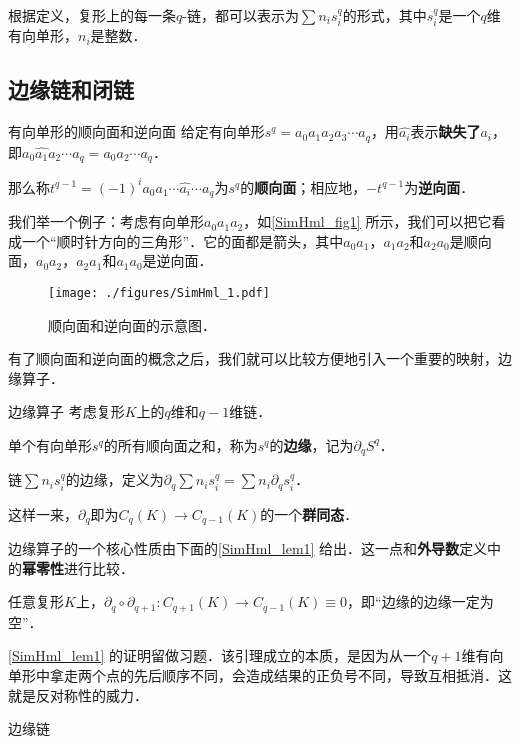 根据定义，复形上的每一条$q$-链，都可以表示为$\sum n_is^q_i$的形式，其中$s^q_i$是一个$q$维有向单形，$n_i$是整数．

\subsection{边缘链和闭链}

\begin{definition}{有向单形的顺向面和逆向面}
给定有向单形$s^q=a_0a_1a_2a_3\cdots a_q$，用$\hat{a_i}$表示\textbf{缺失了}$a_i$，即$a_0\hat{a_1}a_2\cdots a_q=a_0a_2\cdots a_q$．

那么称$t^{q-1}=(-1)^ia_0a_1\cdots\hat{a_i}\cdots a_q$为$s^q$的\textbf{顺向面}；相应地，$-t^{q-1}$为\textbf{逆向面}．
\end{definition}

我们举一个例子：考虑有向单形$a_0a_1a_2$，如\autoref{SimHml_fig1} 所示，我们可以把它看成一个“顺时针方向的三角形”．它的面都是箭头，其中$a_0a_1$，$a_1a_2$和$a_2a_0$是顺向面，$a_0a_2$，$a_2a_1$和$a_1a_0$是逆向面．

\begin{figure}[ht]
\centering
\texttt{[image: ./figures/SimHml\_1.pdf]}
\caption{顺向面和逆向面的示意图．} \label{SimHml_fig1}
\end{figure}

有了顺向面和逆向面的概念之后，我们就可以比较方便地引入一个重要的映射，边缘算子．

\begin{definition}{边缘算子}
考虑复形$K$上的$q$维和$q-1$维链．

单个有向单形$s^q$的所有顺向面之和，称为$s^q$的\textbf{边缘}，记为$\partial_q S^q$．

链$\sum n_is^q_i$的边缘，定义为$\partial_q \sum n_is^q_i=\sum n_i\partial_qs^q_i$．

这样一来，$\partial_q$即为$C_q(K)\to C_{q-1}(K)$的一个\textbf{群同态}．
\end{definition}

边缘算子的一个核心性质由下面的\autoref{SimHml_lem1} 给出．这一点和\textbf{外导数}定义中的\textbf{幂零性}进行比较．

\begin{lemma}{}\label{SimHml_lem1}
任意复形$K$上，$\partial_q\circ\partial_{q+1}:C_{q+1}(K)\to C_{q-1}(K)\equiv 0$，即“边缘的边缘一定为空”．
\end{lemma}

\autoref{SimHml_lem1} 的证明留做习题．该引理成立的本质，是因为从一个$q+1$维有向单形中拿走两个点的先后顺序不同，会造成结果的正负号不同，导致互相抵消．这就是反对称性的威力．

\begin{definition}{边缘链}

\end{definition}











